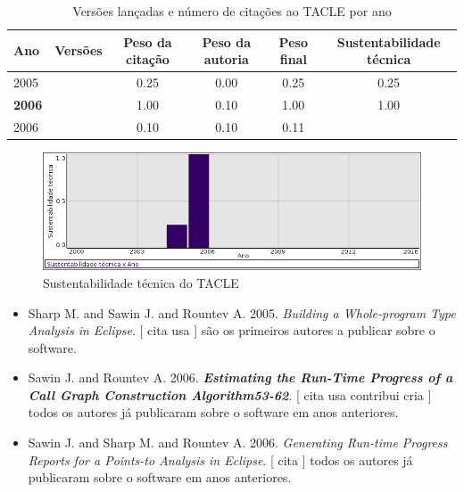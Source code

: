 \begin{table}[H]
\caption{Versões lançadas e número de citações ao TACLE por ano}
\centering
\begin{tabular}{| l | c | c | c | c | c |}
  \hline
  Ano & Versões & Peso da citação & Peso da autoria & Peso final & Sustentabilidade técnica \\
  \hline
            2005
          &
          
          &
          0.25
          &
          0.00
          &
          0.25
          &
            {\color{red} 0.25}
          \\
\hline
            {\bf 2006}
          &
          
          &
          1.00
          &
          0.10
          &
          1.00
          &
            {\color{blue} 1.00}
          \\
            2006
          &
          
          &
          0.10
          &
          0.10
          &
          0.11
          &
          \\
\hline
\end{tabular}
\end{table}

\begin{figure}[h]
  \center
  \includegraphics[scale=0.50]{result-documents/charts/tacle.png}
  \caption{Sustentabilidade técnica do TACLE}
\end{figure}


\begin{itemize}
\item Sharp M. and Sawin J. and Rountev A.
      2005.
        \textit{ Building a Whole-program Type Analysis in Eclipse}.
      [
          cita
          usa
      ]
são os primeiros autores a publicar sobre o software.
\item Sawin J. and Rountev A.
      2006.
        \textbf{\textit{ Estimating the Run-Time Progress of a Call Graph Construction Algorithm53-62}}.
      [
          cita
          usa
          contribui
          cria
      ]
todos os autores já publicaram sobre o software em anos anteriores.
\item Sawin J. and Sharp M. and Rountev A.
      2006.
        \textit{ Generating Run-time Progress Reports for a Points-to Analysis in Eclipse}.
      [
          cita
      ]
todos os autores já publicaram sobre o software em anos anteriores.
\end{itemize}
